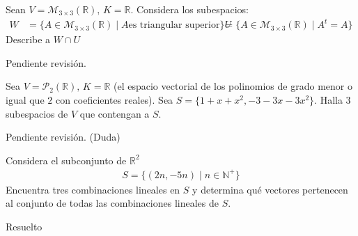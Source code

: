 \begin{exercise}{}{}
Sean $V = \mathcal{M}_{3 \times 3}(\mathbb{R}), \, K = \mathbb{R}$. Considera los subespacios:
\begin{align*}
    W &= \{A \in \mathcal{M}_{3 \times 3}(\mathbb{R}) \mid A \text{es triangular superior}\}
    U &= \{A \in \mathcal{M}_{3 \times 3}(\mathbb{R}) \mid A^t = A\}
\end{align*}
Describe a $W \cap U$

\begin{solution}{}{}
Pendiente revisión.
\end{solution}

\end{exercise}


\begin{exercise}{}{}
    Sea $V = \mathcal{P}_2(\mathbb{R}), \, K = \mathbb{R}$ (el espacio vectorial de los polinomios de grado menor o igual que $2$ con coeficientes reales). Sea $S = \{1+x+x^2, -3-3x-3x^2\}$. Halla $3$ subespacios de $V$ que contengan a $S$.
\begin{solution}{}{}
Pendiente revisión. (Duda)
\end{solution}
\end{exercise}

\begin{exercise}{}{}
Considera el subconjunto de $\mathbb{R}^2$
\begin{align*}
    S = \{(2n, -5n) \mid n \in \mathbb{N}^+\}
\end{align*} 
Encuentra tres combinaciones lineales en $S$ y determina qué vectores pertenecen al conjunto de todas las combinaciones lineales de $S$.
\begin{solution}{}{}
Resuelto
\end{solution}
\end{exercise}
